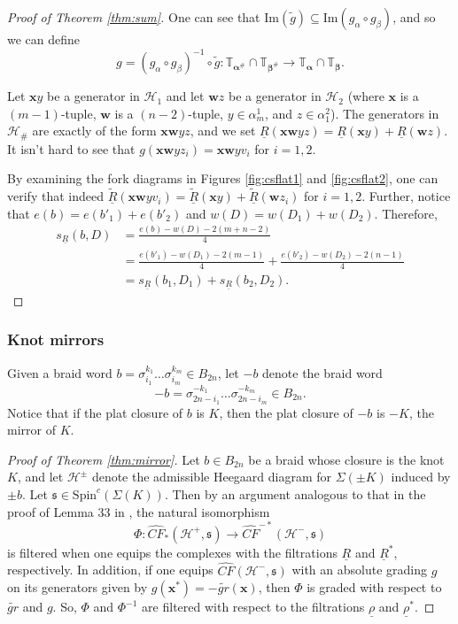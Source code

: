 \documentclass[11pt]{article}
\theoremstyle{plain} \newtheorem{thm}{Theorem}[subsection]
\theoremstyle{plain} \newtheorem{cor}[thm]{Corollary}
\theoremstyle{plain} \newtheorem{prop}[thm]{Proposition}
\theoremstyle{plain} \newtheorem{conj}[thm]{Conjecture}
\theoremstyle{plain} \newtheorem{lem}[thm]{Lemma}
\theoremstyle{definition} \newtheorem{df}[thm]{Definition}
\theoremstyle{remark} \newtheorem{rmk}[thm]{Remark}
\theoremstyle{remark} \newtheorem{obs}[thm]{Observation}
\newcommand{\B}[1]{B_{#1} }
\newcommand{\DBC}[1]{\Sigma(#1)}
\newcommand{\h}{\mathcal{H}}
\newcommand{\tld}[1]{\widetilde{#1}}
\newcommand{\red}[1]{\underline{#1}}
\newcommand{\ba}{\boldsymbol{\alpha}}
\newcommand{\bb}{\boldsymbol{\beta}}
\newcommand{\bx}{\mathbf{x}}
\newcommand{\bw}{\mathbf{w}}
\newcommand{\tor}[1]{\mathbb{T}_{#1}}
\numberwithin{equation}{section}
\begin{document}
\begin{proof}[Proof of Theorem \ref{thm:sum}]
One can see that $\text{Im}\left( \tld{g} \right) \subseteq \text{Im} \left( g_{\alpha} \circ g_{\beta} \right)$, and so we can define
$$g = \left( g_{\alpha} \circ g_{\beta} \right)^{-1} \circ \tld{g} :\tor{\ba^{\#}}\cap\tor{\bb^{\#}} \rightarrow \tor{\ba}\cap\tor{\bb}.$$

Let  $\bx y$ be a generator in $\h_{1}$ and let $\bw z$ be a generator in $\h_{2}$ (where $\bx$ is a $\left( m-1 \right)$-tuple, $\bw$ is a $\left(n-2\right)$-tuple, $y \in \alpha^{1}_{m}$, and $z \in \alpha^{2}_{1}$).  The generators in $\h_{\#}$ are exactly of the form $\bx \bw yz$, and we set $\red{R}(\bx \bw yz) = \red{R}(\bx y) + \red{R}(\bw z)$.  It isn't hard to see that $g(\bx \bw y z_{i}) = \bx \bw y v_{i}$ for $i=1,2.$

By examining the fork diagrams in Figures \ref{fig:csflat1} and \ref{fig:csflat2}, one can verify that indeed $\tld{\red{R}}(\bx \bw y v_{i}) = \tld{\red{R}}(\bx y) + \tld{\red{R}}(\bw z_{i})$ for $i=1,2$.  Further, notice that $e(b) = e(b'_{1}) + e(b'_{2})$ and $w(D) = w(D_{1}) + w(D_{2})$.  Therefore,
\begin{align*}
s_{\red{R}}(b,D) 
&= \frac{e(b) - w(D) - 2(m + n - 2)}{4} \\
&= \frac{e(b'_{1}) - w(D_{1}) - 2(m-1)}{4} + \frac{e(b'_{2}) - w(D_{2}) - 2(n-1)}{4}\\
&=s_{\red{R}}(b_{1},D_{1}) + s_{\red{R}}(b_{2},D_{2}).
\end{align*}
\end{proof}

\subsubsection{Knot mirrors}\label{sec:mirror}

Given a braid word $b = \sigma_{i_{1}}^{k_{1}} \ldots \sigma_{i_{m}}^{k_{m}} \in \B{2n}$, let $-b$ denote the braid word
\begin{equation*}
-b = \sigma_{2n-i_{1}}^{-k_{1}} \ldots \sigma_{2n-i_{m}}^{-k_{m}} \in \B{2n}.
\end{equation*}
Notice that if the plat closure of $b$ is $K$, then the plat closure of $-b$ is $-K$, the mirror of $K$.

\begin{proof}[Proof of Theorem \ref{thm:mirror}]
Let $b \in \B{2n}$ be a braid whose closure is the knot $K$, and let $\h^{\pm}$ denote the admissible Heegaard diagram for $\DBC{\pm K}$ induced by $\pm b$.  Let $\mathfrak{s} \in \text{Spin}^{c}(\DBC{K})$.  Then by an argument analogous to that in the proof of Lemma 33 in \cite{et:R}, the natural isomorphism
$$ \Phi: \widehat{CF}_{*}\left( \h^{+}, \mathfrak{s} \right) \rightarrow \widehat{CF}^{-*}\left( \h^{-}, \mathfrak{s} \right)$$
is filtered when one equips the complexes with the filtrations $\red{R}$ and $\red{R}^{*}$, respectively.  In addition, if one equips $\widehat{CF}\left( \h^{-}, \mathfrak{s} \right)$ with an absolute grading $g$ on its generators given by $g(\bx^{*}) = -\tld{gr}(\bx)$, then $\Phi$ is graded with respect to $\tld{gr}$ and $g$.  So, $\Phi$ and $\Phi^{-1}$ are filtered with respect to the filtrations $\red{\rho}$ and $\red{\rho}^{*}$.
\end{proof}
\end{document}
